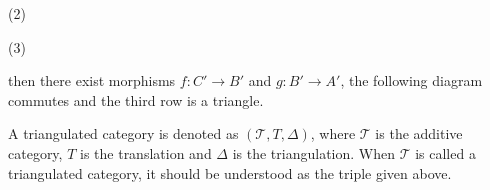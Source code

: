 \begin{definition}
\begin{enumerate}
\begin{center}
                    (2)

                    (3)
                \end{center}
                then there exist morphisms $f : C' \rightarrow B'$ and $g : B' \rightarrow A'$, the following diagram commutes and the third row is a triangle.

                \begin{center}
                \end{center}
        \end{enumerate}
    \end{definition}

    A triangulated category is denoted as $(\mathcal{T}, T, \Delta)$, where $\mathcal{T}$ is the additive category, $T$ is the translation and $\Delta$ is the triangulation. When $\mathcal{T}$ is called a triangulated category, it should be understood as the triple given above.
    
